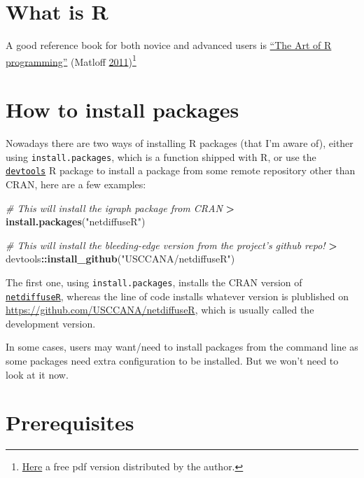 \documentclass[]{book}
\newenvironment{Shaded}{\begin{snugshade}}{\end{snugshade}}
\newcommand{\CommentTok}[1]{\textcolor[rgb]{0.56,0.35,0.01}{\textit{#1}}}
\newcommand{\KeywordTok}[1]{\textcolor[rgb]{0.13,0.29,0.53}{\textbf{#1}}}
\newcommand{\NormalTok}[1]{#1}
\newcommand{\OperatorTok}[1]{\textcolor[rgb]{0.81,0.36,0.00}{\textbf{#1}}}
\newcommand{\StringTok}[1]{\textcolor[rgb]{0.31,0.60,0.02}{#1}}
\begin{document}
\hypertarget{what-is-r}{%
\section{What is R}\label{what-is-r}}

A good reference book for both novice and advanced users is \href{https://nostarch.com/artofr.htm}{``The Art of R programming''} (Matloff \protect\hyperlink{ref-Matloff2011}{2011})\footnote{\href{http://heather.cs.ucdavis.edu/~matloff/145/PLN/RMaterials/NSPpart.pdf}{Here} a free pdf version distributed by the author.}

\hypertarget{how-to-install-packages}{%
\section{How to install packages}\label{how-to-install-packages}}

Nowadays there are two ways of installing R packages (that I'm aware of), either using \texttt{install.packages}, which is a function shipped with R, or use the \href{https://cran.r-project.org/package=devtools}{\texttt{devtools}} R package to install a package from some remote repository other than CRAN, here are a few examples:

\begin{Shaded}
\begin{Highlighting}[]
\CommentTok{# This will install the igraph package from CRAN}
\OperatorTok{>}\StringTok{ }\KeywordTok{install.packages}\NormalTok{(}\StringTok{"netdiffuseR"}\NormalTok{)}

\CommentTok{# This will install the bleeding-edge version from the project's github repo!}
\OperatorTok{>}\StringTok{ }\NormalTok{devtools}\OperatorTok{::}\KeywordTok{install_github}\NormalTok{(}\StringTok{"USCCANA/netdiffuseR"}\NormalTok{)}
\end{Highlighting}
\end{Shaded}

The first one, using \texttt{install.packages}, installs the CRAN version of \href{https://r-project.org/package=netdiffuseR}{\texttt{netdiffuseR}}, whereas the line of code installs whatever version is plublished on \url{https://github.com/USCCANA/netdiffuseR}, which is usually called the development version.

In some cases, users may want/need to install packages from the command line as some packages need extra configuration to be installed. But we won't need to look at it now.

\hypertarget{prerequisites}{%
\section{Prerequisites}\label{prerequisites}}
\end{document}
